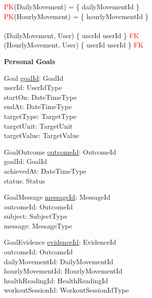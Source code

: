 \documentclass{article}
\begin{document}
\begin{zed}
\textcolor{red}{PK}(DailyMovement) = \{ dailyMovementId \} \\
\textcolor{red}{PK}(HourlyMovement) = \{ hourlyMovementId \} \\
\newline \\ 
(DailyMovement, User) \mapsto \{ userId \mapsto userId \} \in \textcolor{red}{FK} \\
(HourlyMovement, User) \mapsto \{ userId \mapsto userId \} \in \textcolor{red}{FK} \\
\end{zed}
    
\hspace{-0.5cm}\textbf{Personal Goals}

\begin{schema}{Goal}
	\underline{goalId}: GoalId \\
    userId: UserIdType \\
    startOn: DateTimeType \\
    endAt: DateTimeType \\ 
    targetType: TargetType \\
    targetUnit: TargetUnit \\
    targetValue: TargetValue \\ 
\end{schema}

\begin{schema}{GoalOutcome}
	\underline{outcomeId}: OutcomeId \\
    goalId: GoalId \\
    achievedAt: DateTimeType \\
    status: Status \\
\end{schema}

\begin{schema}{GoalMessage}
	\underline{messageId}: MessageId \\
    outcomeId: OutcomeId \\
    subject: SubjectType \\
    message: MessageType \\
\end{schema}

\begin{schema}{GoalEvidence}
	\underline{evidenceId}: EvidenceId \\
    outcomeId: OutcomeId \\
    dailyMovementId: DailyMovementId \\
    hourlyMovementId: HourlyMovementId \\
    healthReadingId: HealthReadingId \\
    workoutSessionId: WorkoutSessionIdType \\
\end{schema}
\end{document}
